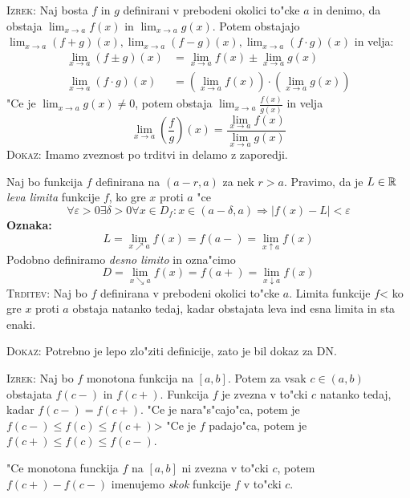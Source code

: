 \textsc{Izrek:} Naj bosta $f$ in $g$ definirani v prebodeni okolici to"cke $a$ in denimo, da obstaja $\lim_{x \to a} f(x)$ in $\lim_{x \to a} g(x)$. Potem obstajajo $\lim_{x \to a} (f + g)(x), \lim_{x \to a} (f - g)(x), \lim_{x \to a} (f \cdot g) (x)$ in velja:
\begin{align*}
\lim_{x \to a} (f \pm g) (x) &= \lim_{x \to a} f(x) \pm \lim_{x \to a} g(x) \\
\lim_{x \to a} (f \cdot g) (x) &= \left(\lim_{x \to a} f(x)\right) \cdot \left(\lim_{x \to a} g(x)\right)
\end{align*}
"Ce je $\lim_{x \to a} g(x) \neq 0$, potem obstaja $\lim_{x \to a} \frac{f(x)}{g(x)}$ in velja
\begin{equation*}
\lim_{x \to a} \left(\dfrac{f}{g}\right)(x) = \dfrac{\lim_{x \to a} f(x)}{\lim_{x \to a} g(x)}
\end{equation*}
\textsc{Dokaz:} Imamo zveznost po trditvi in delamo z zaporedji.

 Naj bo funkcija $f$ definirana na $(a - r, a)$ za nek $r > a$. Pravimo, da je $L \in \mathbb{R}$ \emph{leva limita} funkcije $f$, ko gre $x$ proti $a$ "ce
\begin{equation*}
\forall \varepsilon > 0 \exists \delta > 0 \forall x \in D_f: x \in (a - \delta, a) \Rightarrow |f(x) - L| < \varepsilon
\end{equation*}
\textbf{Oznaka:}
\begin{equation*}
L = \lim_{x \nearrow a} f(x) = f(a-) = \lim_{x \uparrow a} f(x)
\end{equation*}
Podobno definiramo \emph{desno limito} in ozna"cimo 
\begin{equation*}
D = \lim_{x \searrow a} f(x) = f(a + ) = \lim_{x \downarrow a} f(x)
\end{equation*}
%
\textsc{Trditev:} Naj bo $f$ definirana v prebodeni okolici to"cke $a$. Limita funkcije $f$< ko gre $x$ proti $a$ obstaja natanko tedaj, kadar obstajata leva ind esna limita in sta enaki.

\textsc{Dokaz:} Potrebno je lepo zlo"ziti definicije, zato je bil dokaz za DN.

\textsc{Izrek:} Naj bo $f$ monotona funkcija na $[a, b]$. Potem za vsak $c \in (a, b)$ obstajata $f(c-)$ in $f(c+)$. Funkcija $f$ je zvezna v to"cki $c$ natanko tedaj, kadar $f(c-)= f(c+)$. "Ce je nara"s"cajo"ca, potem je $f(c-) \leq f(c) \leq f(c+)$> "Ce je $f$ padajo"ca, potem je $f(c+) \leq f(c) \leq f(c-)$.

 "Ce monotona funckija $f$ na $[a, b]$ ni zvezna v to"cki $c$, potem $f(c+) - f(c-)$ imenujemo \emph{skok} funkcije $f$ v to"cki $c$.

